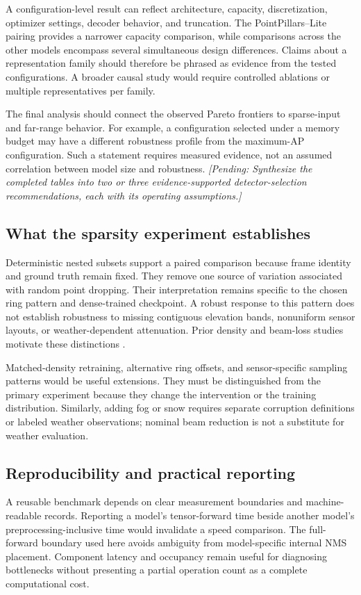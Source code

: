 \documentclass[10pt,twocolumn]{article}
\newcommand{\pending}[1]{\textcolor{blue!55!black}{\textit{[Pending: #1]}}}
\begin{document}
A configuration-level result can reflect architecture, capacity, discretization, optimizer settings, decoder behavior, and truncation. The PointPillars--Lite pairing provides a narrower capacity comparison, while comparisons across the other models encompass several simultaneous design differences. Claims about a representation family should therefore be phrased as evidence from the tested configurations. A broader causal study would require controlled ablations or multiple representatives per family.

The final analysis should connect the observed Pareto frontiers to sparse-input and far-range behavior. For example, a configuration selected under a memory budget may have a different robustness profile from the maximum-AP configuration. Such a statement requires measured evidence, not an assumed correlation between model size and robustness. \pending{Synthesize the completed tables into two or three evidence-supported detector-selection recommendations, each with its operating assumptions.}

\subsection{What the sparsity experiment establishes}
Deterministic nested subsets support a paired comparison because frame identity and ground truth remain fixed. They remove one source of variation associated with random point dropping. Their interpretation remains specific to the chosen ring pattern and dense-trained checkpoint. A robust response to this pattern does not establish robustness to missing contiguous elevation bands, nonuniform sensor layouts, or weather-dependent attenuation. Prior density and beam-loss studies motivate these distinctions \cite{griesbacher2025beamdensity,feng2026beamloss}.

Matched-density retraining, alternative ring offsets, and sensor-specific sampling patterns would be useful extensions. They must be distinguished from the primary experiment because they change the intervention or the training distribution. Similarly, adding fog or snow requires separate corruption definitions or labeled weather observations; nominal beam reduction is not a substitute for weather evaluation.

\subsection{Reproducibility and practical reporting}
A reusable benchmark depends on clear measurement boundaries and machine-readable records. Reporting a model's tensor-forward time beside another model's preprocessing-inclusive time would invalidate a speed comparison. The full-forward boundary used here avoids ambiguity from model-specific internal NMS placement. Component latency and occupancy remain useful for diagnosing bottlenecks without presenting a partial operation count as a complete computational cost.
\end{document}
